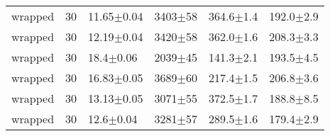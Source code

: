 \begin{tabular}{lrllll}
      wrapped &      30 &   11.65$\pm$0.04 &  3403$\pm$58 &  364.6$\pm$1.4 &   192.0$\pm$2.9 \\
      wrapped &      30 &   12.19$\pm$0.04 &  3420$\pm$58 &  362.0$\pm$1.6 &   208.3$\pm$3.3 \\
      wrapped &      30 &    18.4$\pm$0.06 &  2039$\pm$45 &  141.3$\pm$2.1 &   193.5$\pm$4.5 \\
      wrapped &      30 &   16.83$\pm$0.05 &  3689$\pm$60 &  217.4$\pm$1.5 &   206.8$\pm$3.6 \\
      wrapped &      30 &   13.13$\pm$0.05 &  3071$\pm$55 &  372.5$\pm$1.7 &   188.8$\pm$8.5 \\
      wrapped &      30 &    12.6$\pm$0.04 &  3281$\pm$57 &  289.5$\pm$1.6 &   179.4$\pm$2.9 \\
\hline
\end{tabular}